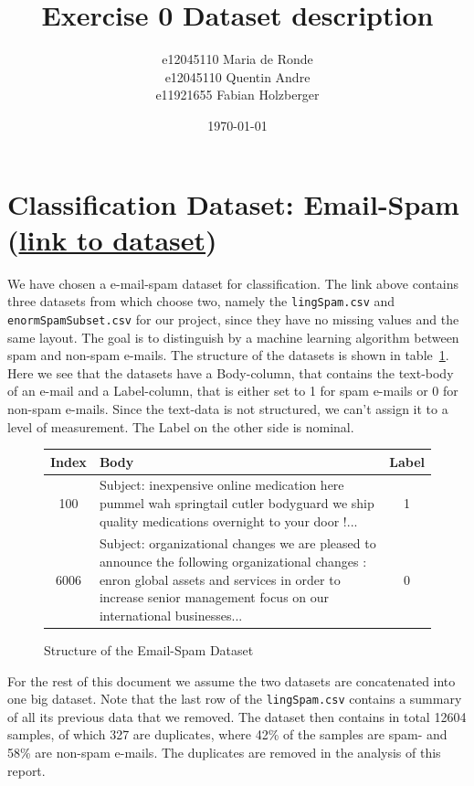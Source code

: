 \documentclass[11pt]{article}
\title{Exercise 0 Dataset description}
\author{e12045110 Maria de Ronde \\ e12045110  Quentin Andre  \\ e11921655 Fabian Holzberger}
\date{\today}
\begin{document}
\graphicspath{{./figures/}}
\maketitle

\newpage
%
\section{Classification Dataset: Email-Spam (\href{https://www.kaggle.com/nitishabharathi/email-spam-dataset?select=enronSpamSubset.csv}{link to dataset})}
We have chosen a e-mail-spam dataset for classification. The link above contains three datasets from which choose two, namely the \texttt{lingSpam.csv} and \texttt{enormSpamSubset.csv} for our project, since they have no missing values and the same layout. The goal is to distinguish by a machine learning algorithm between spam and non-spam e-mails. The structure of the datasets is shown in table~\ref{tab::0}. Here we see that the datasets have a Body-column, that contains the text-body of an e-mail and a Label-column, that is either set to 1 for spam e-mails or 0 for non-spam e-mails. Since the text-data is not structured, we can't assign it to a level of measurement. The Label on the other side is nominal.   
%
\begin{figure}[h]
  \begin{tabular}{ | c | p{15cm} | c |}
    \hline
    Index & Body & Label \\
    \hline
    100 & 
    Subject: inexpensive online medication here
 pummel wah springtail cutler bodyguard
 we ship quality medications overnight to your door !...
    & 1 \\ \hline
    6006
    &
    Subject: organizational changes
 we are pleased to announce the following organizational changes :
 enron global assets and services
 in order to increase senior management focus on our international businesses... 
    & 0 \\
    \hline
    \end{tabular}
    \caption{Structure of the Email-Spam Dataset}
    \label{tab::0}
  \end{figure}
%
For the rest of this document we assume the two datasets are concatenated into one big dataset. Note that the last row of the \texttt{lingSpam.csv} contains a summary of all its previous data that we removed. The dataset then contains in total 12604 samples, of which 327 are duplicates, where 42\% of the samples are spam- and 58\% are non-spam e-mails. The duplicates are removed in the analysis of this report. %
\end{document}
